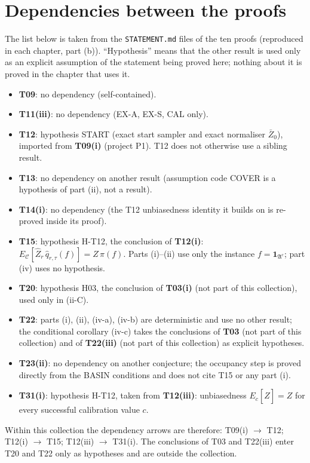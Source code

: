 \documentclass[11pt]{report}
\begin{document}
\chapter*{Dependencies between the proofs}
\noindent The list below is taken from the \texttt{STATEMENT.md} files of the ten proofs (reproduced in each chapter, part (b)). ``Hypothesis'' means that the other result is used only as an explicit assumption of the statement being proved here; nothing about it is proved in the chapter that uses it.
\begin{itemize}
\item \textbf{T09}: no dependency (self-contained).
\item \textbf{T11(iii)}: no dependency (EX-A, EX-S, CAL only).
\item \textbf{T12}: hypothesis START (exact start sampler and exact normaliser $\bar Z_0$), imported from \textbf{T09(i)} (project P1). T12 does not otherwise use a sibling result.
\item \textbf{T13}: no dependency on another result (assumption code COVER is a hypothesis of part (ii), not a result).
\item \textbf{T14(i)}: no dependency (the T12 unbiasedness identity it builds on is re-proved inside its proof).
\item \textbf{T15}: hypothesis H-T12, the conclusion of \textbf{T12(i)}: $E_{\mathcal C}[\widehat Z_r\,\hat q_{r,\tau}(f)]=Z\,\pi(f)$. Parts (i)--(ii) use only the instance $f=\mathbf 1_{\mathfrak A^c}$; part (iv) uses no hypothesis.
\item \textbf{T20}: hypothesis H03, the conclusion of \textbf{T03(i)} (not part of this collection), used only in (ii-C).
\item \textbf{T22}: parts (i), (ii), (iv-a), (iv-b) are deterministic and use no other result; the conditional corollary (iv-c) takes the conclusions of \textbf{T03} (not part of this collection) and of \textbf{T22(iii)} (not part of this collection) as explicit hypotheses.
\item \textbf{T23(ii)}: no dependency on another conjecture; the occupancy step is proved directly from the BASIN conditions and does not cite T15 or any part (i).
\item \textbf{T31(i)}: hypothesis H-T12, taken from \textbf{T12(iii)}: unbiasedness $E_c[\widehat Z]=Z$ for every successful calibration value $c$.
\end{itemize}
\noindent Within this collection the dependency arrows are therefore: T09(i) $\to$ T12; T12(i) $\to$ T15; T12(iii) $\to$ T31(i). The conclusions of T03 and T22(iii) enter T20 and T22 only as hypotheses and are outside the collection.
\end{document}
